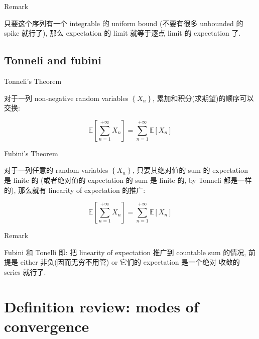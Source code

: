 \documentclass{qlnotes-export}
\begin{document}
\begin{qlremark}{Remark}

只要这个序列有一个 integrable 的 uniform bound (不要有很多 unbounded 的 spike 就行了), 那么 expectation 的 limit 就等于逐点 limit 的 expectation 了.

\end{qlremark}

\subsection{Tonneli and fubini}\label{tonneli-and-fubini}

\begin{theorem}{Tonneli's Theorem}\label{thm-04-lln-tonnelis-theorem}

对于一列 non-negative random variables \(\left\{ X_{n} \right\}\), 累加和积分(求期望)的顺序可以交换:

\[{\mathbb{E}}\left\lbrack {\sum\limits_{n = 1}^{+ \infty}X_{n}} \right\rbrack = \sum\limits_{n = 1}^{+ \infty}{\mathbb{E}}\left\lbrack X_{n} \right\rbrack\]

\end{theorem}

\begin{theorem}{Fubini's Theorem}\label{thm-04-lln-fubinis-theorem}

对于一列任意的 random variables \(\left\{ X_{n} \right\}\), 只要其绝对值的 sum 的 expectation 是 finite 的 (或者绝对值的 expectation 的 sum 是 finite 的, by Tonneli 都是一样的), 那么就有 linearity of expectation 的推广:

\[{\mathbb{E}}\left\lbrack {\sum\limits_{n = 1}^{+ \infty}X_{n}} \right\rbrack = \sum\limits_{n = 1}^{+ \infty}{\mathbb{E}}\left\lbrack X_{n} \right\rbrack\]

\end{theorem}

\begin{qlremark}{Remark}

Fubini 和 Tonelli 即: 把 linearity of expectation 推广到 countable sum 的情况, 前提是 either 非负(因而无穷不用管) or 它们的 expectation 是一个绝对 收敛的 series 就行了.

\end{qlremark}

\section{Definition review: modes of convergence}\label{definition-review-modes-of-convergence}
\end{document}
